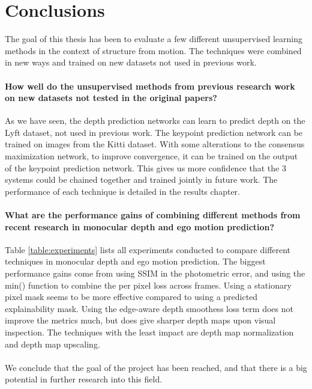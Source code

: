 \section{Conclusions}

The goal of this thesis has been to evaluate a few different unsupervised learning methods in the context of structure from motion. The techniques were combined in new ways and trained on new datasets not used in previous work.

\paragraph{\textbf{How well do the unsupervised methods from previous research work on new datasets not tested in the original papers?}} As we have seen, the depth prediction networks can learn to predict depth on the Lyft dataset, not used in previous work. The keypoint prediction network can be trained on images from the Kitti dataset. With some alterations to the consensus maximization network, to improve convergence, it can be trained on the output of the keypoint prediction network. This gives us more confidence that the 3 systems could be chained together and trained jointly in future work. The performance of each technique is detailed in the results chapter.

\paragraph{\textbf{What are the performance gains of combining different methods from recent research in monocular depth and ego motion prediction?}} Table \ref{table:experiments} lists all experiments conducted to compare different techniques in monocular depth and ego motion prediction. The biggest performance gains come from using SSIM in the photometric error, and using the min() function to combine the per pixel loss across frames. Using a stationary pixel mask seems to be more effective compared to using a predicted explainability mask. Using the edge-aware depth smoothess loss term does not improve the metrics much, but does give sharper depth maps upon visual inspection. The techniques with the least impact are depth map normalization and depth map upscaling.
\\
\\
We conclude that the goal of the project has been reached, and that there is a big potential in further research into this field.